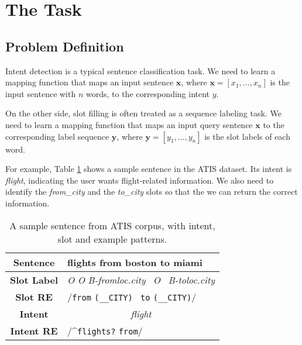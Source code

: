 \section{The Task}
\subsection{Problem Definition}
Intent detection is a typical sentence classification task.
We need to learn a mapping function that maps an input sentence $\textbf{x}$, where $\textbf{x}=[x_{1}, ..., x_{n}]$ is the input sentence with $n$ words, to the corresponding intent $y$.

On the other side, slot filling is often treated as a sequence labeling task. 
We need to learn a mapping function that maps an input query sentence $\textbf{x}$ to the corresponding label sequence $\textbf{y}$, where $\textbf{y}=[y_{1}, ..., y_{n}]$ is the slot labels of each word.

For example, Table \ref{atis_sample} shows a sample sentence in the ATIS dataset. Its intent is \emph{flight}, indicating the user wants flight-related information. We also need to identify the \emph{from\_city} and the \emph{to\_city} slots so that the we can return the correct information.

\begin{table}
\setlength{\tabcolsep}{0.23em}
\centering
\small{
\begin{tabular}{|c|l|}

\hline
\textbf{Sentence} &flights \;\;\;\;\;\;\;\; from \;\;\;\; boston \;\;\;\;\; to \;\;\; miami  \\
\hline
\textbf{Slot Label} &\;\;\; \emph{O} \;\;\;\;\;\;\;\;\;\;\; \emph{O} \; \emph{B-fromloc.city} \, \emph{O} \, \emph{B-toloc.city} \\
\hline
\textbf{Slot RE} & \multicolumn{1}{|l|}{\quad\quad\quad\;\;\;\;\;\;/\texttt{from} \; \texttt{(\_\_CITY)} \, \texttt{to}  \texttt{(\_\_CITY)}/} \\
\hline
\textbf{Intent} &\multicolumn{1}{|c|}{\emph{flight}} \\
\hline
\textbf{Intent RE} & \multicolumn{1}{|l|}{/\textasciicircum \texttt{flights?} \texttt{from}/} \\
\hline
\end{tabular}
}
\caption{A sample sentence from ATIS corpus, with intent, slot and example \RE patterns.}
\label{atis_sample}
\end{table}


